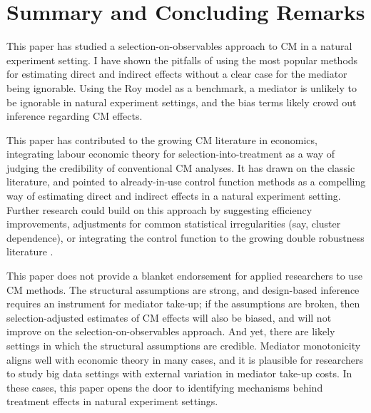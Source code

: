 \section{Summary and Concluding Remarks}
\label{sec:conclusion}

This paper has studied a selection-on-observables approach to CM in a natural experiment setting.
I have shown the pitfalls of using the most popular methods for estimating direct and indirect effects without a clear case for the mediator being ignorable.
Using the Roy model as a benchmark, a mediator is unlikely to be ignorable in natural experiment settings, and the bias terms likely crowd out inference regarding CM effects.

This paper has contributed to the growing CM literature in economics, integrating labour economic theory for selection-into-treatment as a way of judging the credibility of conventional CM analyses.
It has drawn on the classic literature, and pointed to already-in-use control function methods as a compelling way of estimating direct and indirect effects in a natural experiment setting.
Further research could build on this approach by suggesting efficiency improvements, adjustments for common statistical irregularities (say, cluster dependence), or integrating the control function to the growing double robustness literature \citep{farbmacher2022causal,bia2024double}.

This paper does not provide a blanket endorsement for applied researchers to use CM methods.
The structural assumptions are strong, and design-based inference requires an instrument for mediator take-up; if the assumptions are broken, then selection-adjusted estimates of CM effects will also be biased, and will not improve on the selection-on-observables approach.
And yet, there are likely settings in which the structural assumptions are credible.
Mediator monotonicity aligns well with economic theory in many cases, and it is plausible for researchers to study big data settings with external variation in mediator take-up costs.
In these cases, this paper opens the door to identifying mechanisms behind treatment effects in natural experiment settings.
